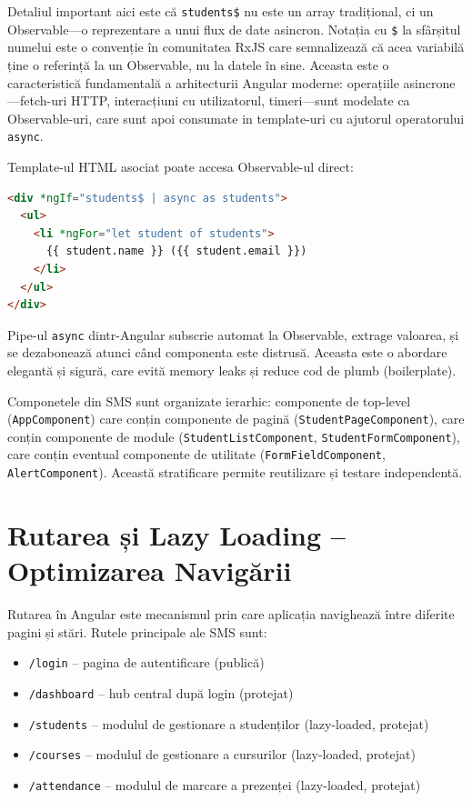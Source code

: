 Detaliul important aici este că \texttt{students\$} nu este un array tradițional, ci un Observable—o reprezentare a unui flux de date asincron. Notația cu \texttt{\$} la sfârșitul numelui este o convenție în comunitatea RxJS care semnalizează că acea variabilă ține o referință la un Observable, nu la datele în sine. Aceasta este o caracteristică fundamentală a arhitecturii Angular moderne: operațiile asincrone—fetch-uri HTTP, interacțiuni cu utilizatorul, timeri—sunt modelate ca Observable-uri, care sunt apoi consumate in template-uri cu ajutorul operatorului \texttt{async}.

Template-ul HTML asociat poate accesa Observable-ul direct:

\begin{lstlisting}[language=HTML]
<div *ngIf="students$ | async as students">
  <ul>
    <li *ngFor="let student of students">
      {{ student.name }} ({{ student.email }})
    </li>
  </ul>
</div>
\end{lstlisting}

Pipe-ul \texttt{async} dintr-Angular subscrie automat la Observable, extrage valoarea, și se dezabonează atunci când componenta este distrusă. Aceasta este o abordare elegantă și sigură, care evită memory leaks și reduce cod de plumb (boilerplate).

Componetele din SMS sunt organizate ierarhic: componente de top-level (\texttt{AppComponent}) care conțin componente de pagină (\texttt{StudentPageComponent}), care conțin componente de module (\texttt{StudentListComponent}, \texttt{StudentFormComponent}), care conțin eventual componente de utilitate (\texttt{FormFieldComponent}, \texttt{AlertComponent}). Această stratificare permite reutilizare și testare independentă.

\section{Rutarea și Lazy Loading – Optimizarea Navigării}

Rutarea în Angular este mecanismul prin care aplicația navighează între diferite pagini și stări. Rutele principale ale SMS sunt:

\begin{itemize}
  \item \texttt{/login} – pagina de autentificare (publică)
  \item \texttt{/dashboard} – hub central după login (protejat)
  \item \texttt{/students} – modulul de gestionare a studenților (lazy-loaded, protejat)
  \item \texttt{/courses} – modulul de gestionare a cursurilor (lazy-loaded, protejat)
  \item \texttt{/attendance} – modulul de marcare a prezenței (lazy-loaded, protejat)
\end{itemize}


